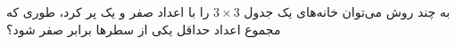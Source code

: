 \EXERCISE
به چند روش می‌توان خانه‌های یک جدول
$3\times3$
را با اعداد صفر و یک پر کرد، طوری که مجموع اعداد حداقل یکی از سطر‌ها برابر صفر شود؟